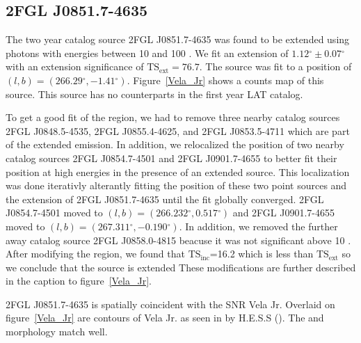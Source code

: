 \documentclass[12pt,preprint]{aastex}
\newcommand{\gev}{\text{GeV}\xspace}
\newcommand{\tev}{\text{TeV}\xspace}
\newcommand{\tsext}{{\ensuremath{\text{TS}_\text{ext}}}\xspace}
\newcommand{\tsinc}{\ensuremath{\text{TS}_\text{inc}}\xspace}
\renewcommand{\deg}{\ensuremath{^\circ}\xspace}
\begin{document}
\subsection{2FGL J0851.7-4635}
\label{section_2FGL_J0851.7-4635}


The two year catalog source 2FGL J0851.7-4635 was found to be
extended using photons with energies between 10 \gev and 100
\gev. We fit an extension of $1.12\deg\pm0.07\deg$ with an extension
significance of $\tsext=76.7$.  The source was fit to a position of
$(l,b)=(266.29\deg,-1.41\deg)$.  Figure~\ref{Vela_Jr} shows a counts
map of this source.  This source has no counterparts in the first year
LAT catalog.

To get a good fit of the region, we had to remove three nearby catalog
sources 2FGL J0848.5-4535, 2FGL J0855.4-4625, and 2FGL J0853.5-4711
which are part of the extended emission.  In addition, we relocalized
the position of two nearby catalog sources 2FGL J0854.7-4501 and 2FGL
J0901.7-4655 to better fit their position at high energies in the presence
of an extended source.  This localization was done iterativly alterantly
fitting the position of these two point sources and the extension of
2FGL J0851.7-4635 until the fit globally converged.  2FGL J0854.7-4501
moved to $(l,b)=(266.232\deg,0.517\deg)$ and 2FGL J0901.7-4655 moved to
$(l,b)=(267.311\deg,-0.190\deg)$. In addition, we removed the further away
catalog source 2FGL J0858.0-4815 beacuse it was not significant above 10
\gev.  After modifying the region, we found that \tsinc=16.2 which is less
than \tsext so we conclude that the source is extended These modifications
are further described in the caption to figure~\ref{Vela_Jr}.

2FGL J0851.7-4635 is spatially coincident with the SNR Vela Jr.  Overlaid
on figure~\ref{Vela_Jr} are contours of Vela Jr. as seen in \tev by
H.E.S.S (\cite{vela_jr_hess}).  The \gev and \tev morphology match well.

\end{document}
